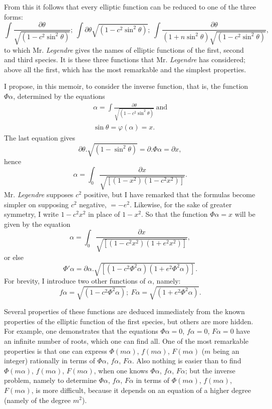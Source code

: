 \documentclass{article}
\begin{document}
From this it follows that every elliptic function can be reduced to one of the three forms:
\[ \int\frac{\partial\theta}{\sqrt{(1-c^{2}\sin^{2}\theta)}};\ \int\partial\theta\sqrt{(1-c^{2}\sin^{2}\theta)};\ \int\frac{\partial\theta}{(1+n\sin^{2}\theta)\sqrt{(1-c^{2}\sin^{2}\theta)}}, \]
to which Mr. \emph{Legendre} gives the names of elliptic functions of the first, second and third species. It is these three functions that Mr. \emph{Legendre} has considered; above all the first, which has the most remarkable and the simplest properties.

I propose, in this memoir, to consider the inverse function, that is, the function $\Phi\alpha$, determined by the equations
\[ \begin{gathered} \alpha=\int\frac{\partial\theta}{\sqrt{(1-c^{2}\sin^{2}\theta)}}\ \text{and}\\ \sin\theta=\varphi(\alpha)=x. \end{gathered} \]
The last equation gives
\[ \partial\theta.\sqrt{(1-\sin^{2}\theta)}=\partial.\Phi\alpha=\partial x, \]
hence
\[ \alpha=\int_{0}\frac{\partial x}{\sqrt{[(1-x^{2})(1-c^{2}x^{2})]}}. \]
Mr. \emph{Legendre} supposes $c^{2}$ positive, but I have remarked that the formulas become simpler on supposing $c^{2}$ negative, $=-e^{2}$. Likewise, for the sake of greater symmetry, I write $1-c^{2}x^{2}$ in place of $1-x^{2}$. So that the function $\Phi\alpha=x$ will be given by the equation
\[ \alpha=\int_{0}\frac{\partial x}{\sqrt{[(1-c^{2}x^{2})(1+e^{2}x^{2})]}}, \]
or else
\[ \Phi'\alpha=\partial\alpha.\sqrt{[(1-c^{2}\Phi^{2}\alpha)(1+e^{2}\Phi^{2}\alpha)]}.\]
For brevity, I introduce two other functions of $\alpha$, namely:
\[ f\alpha=\sqrt{(1-c^{2}\Phi^{2}\alpha)};\ F\alpha=\sqrt{(1+e^{2}\Phi^{2}\alpha)}. \]


Several properties of these functions are deduced immediately from the known properties of the elliptic function of the first species, but others are more hidden. For example, one demonstrates that the equations $\Phi\alpha=0$, $f\alpha=0$, $F\alpha=0$ have an infinite number of roots, which one can find all. One of the most remarkable properties is that one can express $\Phi(m\alpha)$, $f(m\alpha)$, $F(m\alpha)$ ($m$ being an integer) rationally in terms of $\Phi\alpha$, $f\alpha$, $F\alpha$. Also nothing is easier than to find $\Phi(m\alpha)$, $f(m\alpha)$, $F(m\alpha)$, when one knows $\Phi\alpha$, $f\alpha$, $F\alpha$; but the inverse problem, namely to determine $\Phi\alpha$, $f\alpha$, $F\alpha$ in terms of $\Phi(m\alpha)$, $f(m\alpha)$, $F(m\alpha)$, is more difficult, because it depends on an equation of a higher degree (namely of the degree $m^{2}$).
\end{document}
